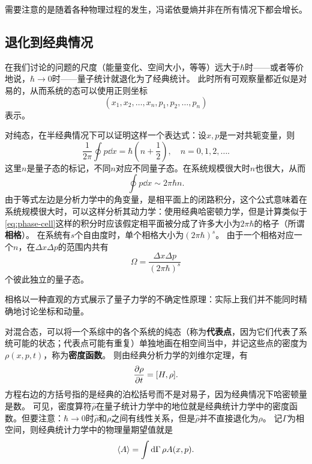 \documentclass[hyperref, UTF8, a4paper]{ctexart}
\begin{document}
需要注意的是随着各种物理过程的发生，冯诺依曼熵并非在所有情况下都会增长。

\subsection{退化到经典情况}\label{sec:back-to-classical}

在我们讨论的问题的尺度（能量变化、空间大小，等等）远大于$\hbar$时——或者等价地说，$\hbar\to 0$时——量子统计就退化为了经典统计。
此时所有可观察量都近似是对易的，从而系统的态可以使用正则坐标
\[
    (x_1, x_2, \ldots, x_n, p_1, p_2, \ldots, p_n)
\]
表示。

对纯态，在半经典情况下可以证明这样一个表达式：设$x,p$是一对共轭变量，则
\begin{equation}
    \frac{1}{2\pi} \oint p \dd{x} = \hbar \left(n + \frac{1}{2}\right), \quad n = 0, 1, 2, \ldots.
\end{equation}
这里$n$是量子态的标记，不同$n$对应不同量子态。在系统规模很大时$n$也很大，从而
\begin{equation}
    \oint p \dd{x} \sim 2 \pi \hbar n.
    \label{eq:phase-cell}
\end{equation}
由于等式左边是分析力学中的角变量，是相平面上的闭路积分，这个公式意味着在系统规模很大时，可以这样分析其动力学：使用经典哈密顿力学，但是计算类似于\eqref{eq:phase-cell}这样的积分时应该假定相平面被分成了许多大小为$2\pi \hbar$的格子（所谓\textbf{相格}）。
在系统有$s$个自由度时，单个相格大小为$(2\pi \hbar)^s$。
由于一个相格对应一个$n$，在$\Delta x \Delta p$的范围内共有
\begin{equation}
    \Omega = \frac{\Delta x \Delta p}{(2\pi \hbar)^s}
\end{equation}
个彼此独立的量子态。

相格以一种直观的方式展示了量子力学的不确定性原理：实际上我们并不能同时精确地讨论坐标和动量。

对混合态，可以将一个系综中的各个系统的纯态（称为\textbf{代表点}，因为它们代表了系统可能的状态；代表点可能有重复）单独地画在相空间当中，并记这些点的密度为$\rho(x, p, t)$，称为\textbf{密度函数}。
则由经典分析力学的刘维尔定理，有
\begin{equation}
    \pdv{\rho}{t} = [H, \rho].
\end{equation}
方程右边的方括号指的是经典的泊松括号而不是对易子，因为经典情况下哈密顿量是数。
可见，密度算符$\hat{\rho}$在量子统计力学中的地位就是经典统计力学中的密度函数。但要注意：$\hbar\to 0$时$\hat{\rho}$和$\rho$之间有线性关系，但是$\hat{\rho}$并不直接退化为$\rho$。
记$\Gamma$为相空间，则经典统计力学中的物理量期望值就是
\begin{equation}
    \expval{A} = \int \dd{\Gamma} \rho A(x, p).
\end{equation}
\end{document}
